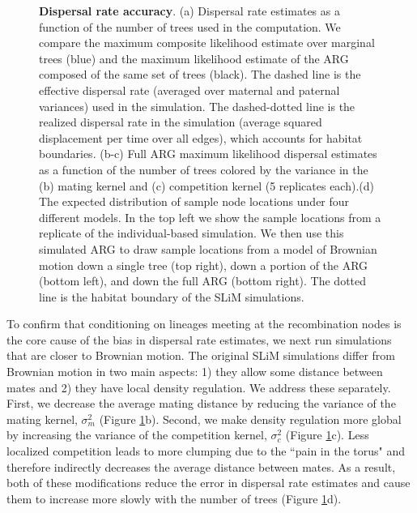 \begin{figure}[H]
\caption{\textbf{Dispersal rate accuracy}. (a) Dispersal rate estimates as a function of the number of trees used in the computation. We compare the maximum composite likelihood estimate over marginal trees (blue) and the maximum likelihood estimate of the ARG composed of the same set of trees (black). The dashed line is the effective dispersal rate (averaged over maternal and paternal variances) used in the simulation. The dashed-dotted line is the realized dispersal rate in the simulation (average squared displacement per time over all edges), which accounts for habitat boundaries.
(b-c) Full ARG maximum likelihood dispersal estimates as a function of the number of trees colored by the variance in the (b) mating kernel and (c) competition kernel (5 replicates each).(d) The expected distribution of sample node locations under four different models. In the top left we show the sample locations from a replicate of the individual-based simulation. We then use this simulated ARG to draw sample locations from a model of Brownian motion down a single tree (top right), down a portion of the ARG (bottom left), and down the full ARG (bottom right). The dotted line is the habitat boundary of the SLiM simulations.  } \label{fig:DispRate}
\end{figure}


To confirm that conditioning on lineages meeting at the recombination nodes is the core cause of the bias in dispersal rate estimates, we next run simulations that are closer to Brownian motion. The original SLiM simulations differ from Brownian motion in two main aspects: 1) they allow some distance between mates and 2) they have local density regulation. We address these separately. First, we decrease the average mating distance by reducing the variance of the mating kernel, $\sigma^2_m$ (Figure \ref{fig:DispRate}b). Second, we make density regulation more global by increasing the variance of the competition kernel, $\sigma^2_c$ (Figure \ref{fig:DispRate}c). Less localized competition leads to more clumping due to the ``pain in the torus" \citep{Felsenstein1975} and therefore indirectly decreases the average distance between mates. As a result, both of these modifications reduce the error in dispersal rate estimates and cause them to increase more slowly with the number of trees (Figure \ref{fig:DispRate}d).


